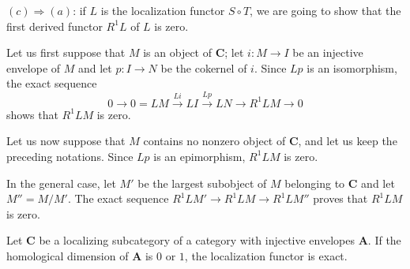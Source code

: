 $(c)\Rightarrow(a)$: if $L$ is the localization functor $S\circ T$, we
are going to show that the first derived functor $R^{1}L$ of $L$ is zero.

Let us first suppose that $M$ is an object of $\mathbf{C}$; let
$i\colon M\to I$ be an injective envelope of $M$ and let $p\colon I\to N$ be the cokernel of $i$.
Since $Lp$ is an isomorphism, the exact sequence
\[
  0\to 0=LM \xrightarrow{Li} LI \xrightarrow{Lp} LN \to R^{1}LM \to 0
\]
shows that $R^{1}LM$ is zero.

Let us now suppose that $M$ contains no nonzero object of $\mathbf{C}$,
and let us keep the preceding notations. Since $Lp$ is an epimorphism,
$R^{1}LM$ is zero.

In the general case, let $M'$ be the largest subobject of $M$ belonging
to $\mathbf{C}$ and let $M''=M/M'$. The exact sequence
$R^{1}LM'\to R^{1}LM\to R^{1}LM''$ proves that $R^{1}LM$ is zero.

\begin{unnumberedcorollary}
Let $\mathbf{C}$ be a localizing subcategory of a category with injective
envelopes $\mathbf{A}$. If the homological dimension of $\mathbf{A}$ is
$0$ or $1$, the localization functor is exact.
\end{unnumberedcorollary}